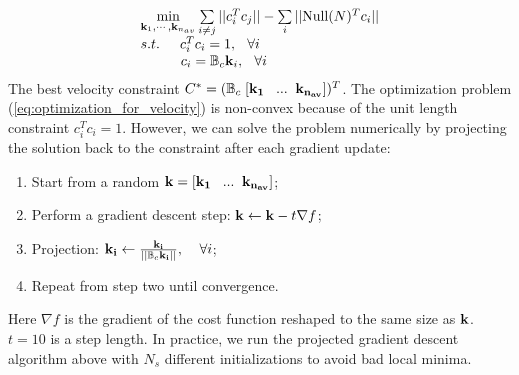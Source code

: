 \begin{equation}
\label{eq:optimization_for_velocity}
\begin{array}{l}
\mathop {\min }\limits_{{{\bf{k}}_1}, \cdots ,{{\bf{k}}_{{n_{av}}}}} \sum\limits_{i \ne j} {||{c_i^T}c _j|{|}}  - \sum\limits_i {||{\rm Null}(N)^T c _i|{|}} \\
s.t.\;\;\,\;\;\,{c_i^T}c_i = 1,\;\;\,\forall i\\
\;\;\,\;\;\,\;\;\,\;\;\,{c _i} = \mathbb{B}_c{{\bf{k}}_i},\;\;\,\forall i
\end{array}
\end{equation}
The best velocity constraint $C^*=(\mathbb{B}_c\;[{\bf k_1\;\;\;...\;\; k_{n_{av}}}])^T$. The optimization problem (\ref{eq:optimization_for_velocity}) is non-convex because of the unit length constraint $c_i^Tc_i=1$. However, we can solve the problem numerically by projecting the solution back to the constraint after each gradient update:
\begin{enumerate}
  \item Start from a random ${\bf k=[{\bf k_1\;\;\;...\;\; k_{n_{av}}}]}$;
  \item Perform a gradient descent step: ${\bf k}\gets {\bf k} - t\nabla f$;
  \item Projection: ${\bf k_i}\gets \frac{\bf k_i}{||\mathbb{B}_c{\bf k_i}||},\;\;\;\;\forall i$;
  \item Repeat from step two until convergence.
\end{enumerate}
Here $\nabla f$ is the gradient of the cost function reshaped to the same size as $\bf k$. $t=10$ is a step length. In practice, we run the projected gradient descent algorithm above with $N_s$ different initializations to avoid bad local minima.

